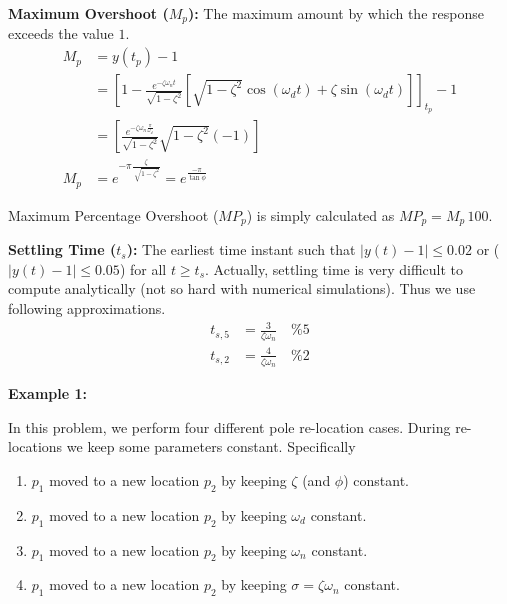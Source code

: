 \documentclass[twoside]{article}
\begin{document}
\textbf{Maximum Overshoot ($M_p$):}  The maximum amount by which the response exceeds the value $1$.
\begin{align*}
	M_p &= y(t_p) - 1
	\\
	&= \left[1 - \frac{e^{-\zeta \omega_n t}}{ \sqrt{1 - \zeta^2} } \left[ \sqrt{1 - \zeta^2} \cos(\omega_d t) + \zeta \sin(\omega_d t) 
\right] \right]_{t_p} - 1
\\
&= \left[ \frac{e^{-\zeta \omega_n \frac{\pi}{\omega_d}}}{ \sqrt{1 - \zeta^2} } \sqrt{1 - \zeta^2} (-1) \right] 
\\
M_p &= e^{-\pi  \frac{\zeta}{\ \sqrt{1 - \zeta^2}}} = e^{\frac{-\pi}{\tan \phi}} 
\end{align*}

Maximum Percentage Overshoot ($MP_p$) is simply calculated as $MP_p =
M_p \, 100$.

\textbf{Settling Time ($t_s$):}  The earliest time instant such that
$|y(t) - 1| \leq 0.02$ or ($|y(t) - 1| \leq 0.05$) for all $t \geq
t_s$. Actually, settling time is very difficult to compute analytically (not
so hard with numerical simulations). Thus we use following
approximations.
%
\begin{align*}
  t_{s,5} &=\frac{3}{\zeta \omega_n} \quad \%5 
\\ 
  t_{s,2} &=\frac{4}{\zeta \omega_n} \quad \%2
\end{align*} 


\textbf{Example 1:} 

In this problem, we perform four different pole
re-location cases. During re-locations we keep some parameters
constant. Specifically
%
\begin{enumerate}
\item $p_1$ moved to a new location $p_2$ by keeping $\zeta$ (and
  $\phi$) constant.
\item $p_1$ moved to a new location $p_2$ by keeping $\omega_d$
  constant.
\item $p_1$ moved to a new location $p_2$ by keeping $\omega_n$
  constant.
\item $p_1$ moved to a new location $p_2$ by keeping $\sigma = \zeta \omega_n$
  constant.
\end{enumerate}
\end{document}
